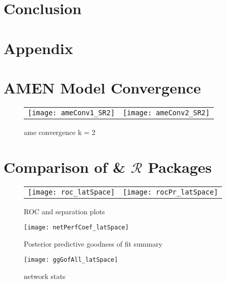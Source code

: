 \section{Conclusion}



\newpage
\section{Appendix}

\section{AMEN Model Convergence}

\begin{figure}[ht]
	\centering
	\begin{tabular}{cc}
	\texttt{[image: ameConv1\_SR2]} &
	\texttt{[image: ameConv2\_SR2]}
	\end{tabular}
	\caption{ame convergence k = 2}
	\label{fig:ameConv}
\end{figure}
\FloatBarrier
\newpage

\section{Comparison of  \&  $\mathcal{R}$ Packages}



% 

\begin{figure}[ht]
	\centering
	\begin{tabular}{cc}
	\texttt{[image: roc\_latSpace]} & 
	\texttt{[image: rocPr\_latSpace]}
	\end{tabular}
	\caption{ROC and separation plots}
	\label{fig:roc_latentSpace}
\end{figure}

\begin{figure}[ht]
	\centering
	\texttt{[image: netPerfCoef\_latSpace]}
	\caption{Posterior predictive goodness of fit summary}
	\label{fig:netPerfCoef_latSpace}
\end{figure}

\begin{figure}[ht]
	\centering
	\texttt{[image: ggGofAll\_latSpace]}
	\caption{network stats }
	\label{fig:gofAll_latSpace}
\end{figure}
\FloatBarrier
\newpage

